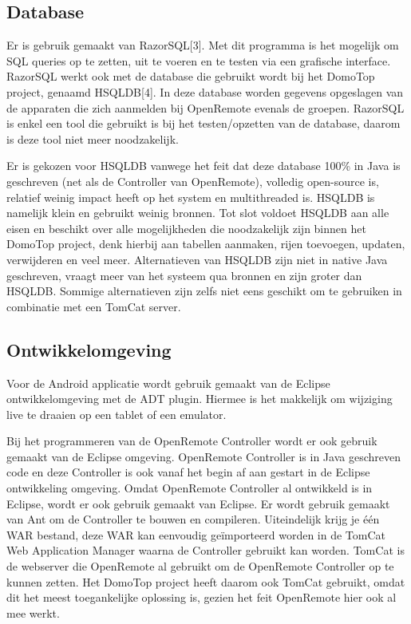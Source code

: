 \documentclass[]{article}
\begin{document}
\subsection{Database}
Er is gebruik gemaakt van RazorSQL[3]. Met dit programma is het mogelijk om
SQL queries op te zetten, uit te voeren en te testen via een grafische
interface. RazorSQL werkt ook met de database die gebruikt wordt bij het DomoTop project,
genaamd HSQLDB[4]. In deze database worden gegevens opgeslagen van de
apparaten die zich aanmelden bij OpenRemote evenals de groepen.
RazorSQL is enkel een tool die gebruikt is bij het
testen/opzetten van de database, daarom is deze tool niet meer
noodzakelijk.

Er is gekozen voor HSQLDB vanwege het feit dat deze database 100\% in Java
is geschreven (net als de Controller van OpenRemote), volledig open-source is,
relatief weinig impact heeft op het system en multithreaded is.
HSQLDB is namelijk klein en gebruikt weinig bronnen. Tot slot voldoet
HSQLDB aan alle eisen en beschikt over alle mogelijkheden die noodzakelijk
zijn binnen het DomoTop project, denk hierbij aan tabellen aanmaken, rijen
toevoegen, updaten, verwijderen en veel meer. Alternatieven van HSQLDB zijn
niet in native Java geschreven,  vraagt meer van het systeem qua
bronnen en zijn groter dan HSQLDB. Sommige alternatieven zijn zelfs niet
eens geschikt om te gebruiken in combinatie met een TomCat server.

\subsection{Ontwikkelomgeving}
Voor de Android applicatie wordt gebruik gemaakt van de Eclipse
ontwikkelomgeving met de ADT plugin. Hiermee is het makkelijk om wijziging
live te draaien op een tablet of een emulator.

Bij het programmeren van de OpenRemote Controller wordt er ook gebruik gemaakt
van de Eclipse omgeving. OpenRemote Controller is in Java geschreven code
en deze Controller is ook vanaf het begin af aan gestart in de Eclipse
ontwikkeling omgeving. Omdat OpenRemote Controller al ontwikkeld is in
Eclipse, wordt er ook gebruik gemaakt van Eclipse. Er wordt gebruik gemaakt van Ant om de Controller te bouwen en compileren. Uiteindelijk krijg
je \'e\'en WAR bestand, deze WAR kan eenvoudig ge\"importeerd worden in de TomCat
Web Application Manager waarna de Controller gebruikt kan worden. TomCat is
de webserver die OpenRemote al gebruikt om de OpenRemote Controller op te
kunnen zetten. Het DomoTop project heeft daarom ook TomCat gebruikt, omdat
dit het meest toegankelijke oplossing is, gezien het feit OpenRemote hier
ook al mee werkt.
\end{document}

